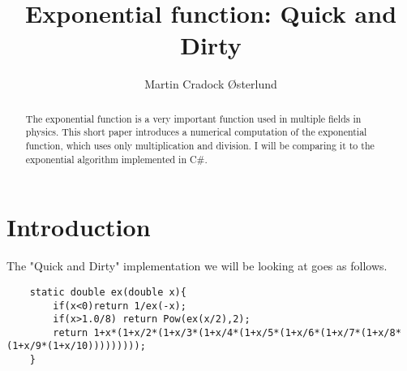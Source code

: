 \documentclass[10pt]{article}
\begin{document}
\title{Exponential function: Quick and Dirty}
\author{Martin Cradock Østerlund}
\maketitle

\begin{abstract}
    The exponential function is a very important function used in multiple fields in physics. This short paper introduces a 
    numerical computation of the exponential function, which uses only multiplication and division. I will be comparing it to 
    the exponential algorithm implemented in C\#. 
\end{abstract}

\section{Introduction}
    The "Quick and Dirty" implementation we will be looking at goes as follows.
    \begin{verbatim}
    static double ex(double x){
        if(x<0)return 1/ex(-x);
        if(x>1.0/8) return Pow(ex(x/2),2);
        return 1+x*(1+x/2*(1+x/3*(1+x/4*(1+x/5*(1+x/6*(1+x/7*(1+x/8*(1+x/9*(1+x/10)))))))));
    }
    \end{verbatim}

    
\end{document}
